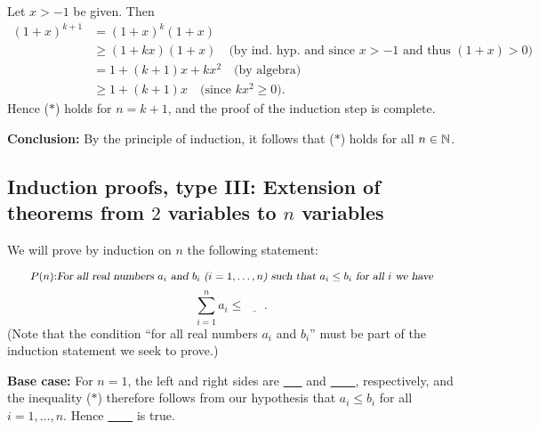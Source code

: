 Let $x>-1$ be given. Then
\begin{align*}
(1+x)^{k+1}
&=(1+x)^k(1+x)
\\
&\ge (1+kx)(1+x) 
\quad\text{(by ind. hyp. and since $x>-1$ and thus $(1+x)>0$)}
\\
&=1+(k+1)x +kx^2
\quad\text{(by algebra)}
\\
&\ge 1+(k+1)x 
\quad\text{(since $kx^2\ge0$)}.
\end{align*}
Hence ($*$) holds for $n=k+1$, and the proof of the induction step is
complete.

\textbf{Conclusion:} By the principle of induction, it follows that ($*$)
holds for all $n\in\mathbb{N}$.

\subsection{Induction proofs, type III:
Extension of theorems from $2$ variables to $n$ variables}

We will prove by induction on $n$ the following statement: 

\[
\tag*{$P(n)$:}
\parbox{5in}{\slshape For all real numbers $a_i$ and $b_i$ ($i=1,\dots,n$)
such that $a_i\le b_i$ for all $i$ we
have}
\]
\[
\sum_{i=1}^na_i\le \underline{~~~~~~~}. 
\tag{$*$}
\]
(Note that the condition ``for all real numbers $a_i$ and $b_i$''
must be part of the induction statement we seek to prove.)

\textbf{Base case:} For $n=1$, the 
left and right sides are \underline{~~~} and \underline{~~~~}, respectively, and the
inequality ($*$) therefore follows from our hypothesis that
$a_i\le b_i$ for all $i=1,\dots,n$.  Hence \underline{~~~~} is true.

